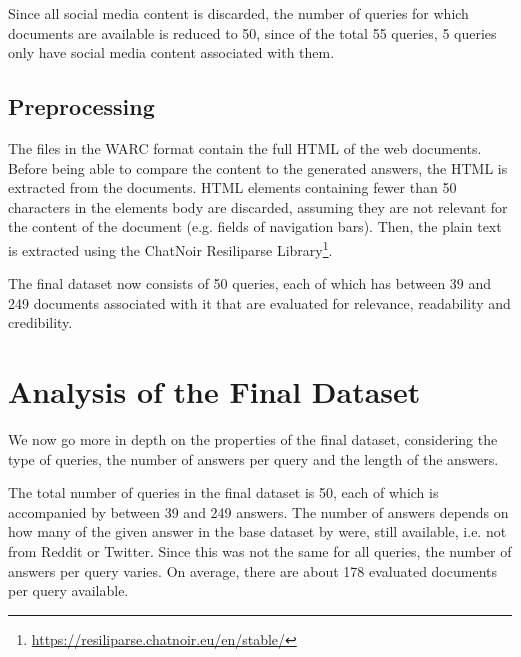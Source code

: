 Since all social media content is discarded, the number of queries for which documents are available is reduced to 50, since of the total 55 queries, 5 queries only have social media content associated with them.

\subsection{Preprocessing}
The files in the WARC format contain the full HTML of the web documents.
Before being able to compare the content to the generated answers, the HTML is extracted from the documents.
HTML elements containing fewer than 50 characters in the elements body are discarded, assuming they are not relevant for the content of the document (e.g. fields of navigation bars).
Then, the plain text is extracted using the ChatNoir Resiliparse Library\footnote{\url{https://resiliparse.chatnoir.eu/en/stable/}}.

The final dataset now consists of 50 queries, each of which has between 39 and 249 documents associated with it that are evaluated for relevance, readability and credibility.

\section{Analysis of the Final Dataset}
We now go more in depth on the properties of the final dataset, considering the type of queries, the number of answers per query and the length of the answers.

The total number of queries in the final dataset is 50, each of which is accompanied by between 39 and 249 answers.
The number of answers depends on how many of the given answer in the base dataset by \cite{goeuriot:2021:Consumer} were, still available, i.e. not from Reddit or Twitter.
Since this was not the same for all queries, the number of answers per query varies.
On average, there are about 178 evaluated documents per query available.

